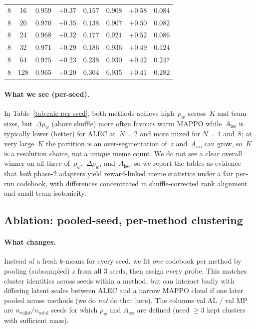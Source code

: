 \begin{table}[t]
\begin{tabular}{cccccccc}
8 & 16 & $0.959$ & $+0.37$ & $0.157$ & $0.908$ & $+0.58$ & $0.084$ \\
8 & 20 & $0.970$ & $+0.35$ & $0.138$ & $0.907$ & $+0.50$ & $0.082$ \\
8 & 24 & $0.968$ & $+0.32$ & $0.177$ & $0.921$ & $+0.52$ & $0.086$ \\
8 & 32 & $0.971$ & $+0.29$ & $0.186$ & $0.936$ & $+0.49$ & $0.124$ \\
8 & 64 & $0.975$ & $+0.23$ & $0.238$ & $0.930$ & $+0.42$ & $0.247$ \\
8 & 128 & $0.965$ & $+0.20$ & $0.304$ & $0.935$ & $+0.41$ & $0.282$ \\
\bottomrule
\end{tabular}
\end{table}

\paragraph{What we see (per-seed).}
In Table~\ref{tab:rale-per-seed}, both methods achieve high~$\rho_w$ across~$K$ and team sizes, but~$\Delta\rho_w$ (above shuffle) more often favours warm MAPPO while~$A_{\mathrm{iso}}$ is typically lower (better) for ALEC at~$N{=}2$ and more mixed for $N{=}4$ and~$8$; at very large~$K$ the partition is an over-segmentation of~$z$ and~$A_{\mathrm{iso}}$ can grow, so~$K$ is a resolution choice, not a unique meme count.
We do not see a clear overall winner on all three of~$\rho_w$,~$\Delta\rho_w$, and~$A_{\mathrm{iso}}$, so we report the tables as evidence that \emph{both} phase-2 adapters yield reward-linked meme statistics under a fair per-run codebook, with differences concentrated in shuffle-corrected rank alignment and small-team isotonicity.

\subsection{Ablation: pooled-seed, per-method clustering}
\label{sec:rale-per-method}

\paragraph{What changes.}
Instead of a fresh $k$-means for every seed, we fit \emph{one} codebook per method by pooling (subsampled) $z$ from all $3$ seeds, then assign every probe. This matches cluster identities across seeds within a method, but can interact badly with differing latent scales between ALEC and a narrow MAPPO cloud if one later pooled across methods (we do \emph{not} do that here).
The columns \textsf{val AL} / \textsf{val MP} are $n_{\mathrm{valid}}/n_{\mathrm{total}}$ seeds for which $\rho_w$ and $A_{\mathrm{iso}}$ are defined (need $\ge3$ kept clusters with sufficient mass).

